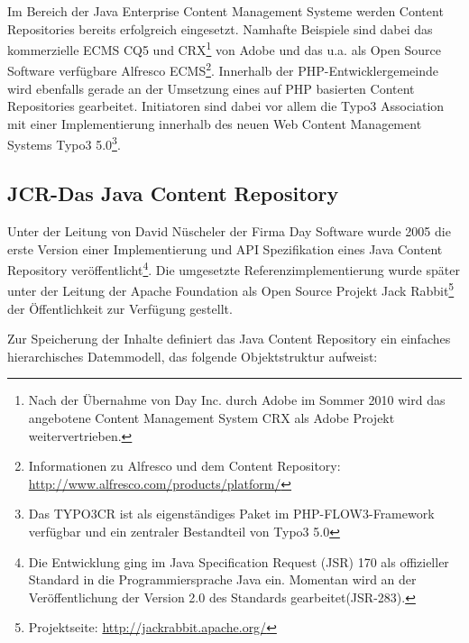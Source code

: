 Im Bereich der Java Enterprise Content Management Systeme werden Content Repositories bereits erfolgreich eingesetzt. Namhafte Beispiele sind dabei das kommerzielle ECMS CQ5 und CRX\footnote{Nach der Übernahme von Day Inc. durch Adobe im Sommer 2010 wird das angebotene Content Management System CRX als Adobe Projekt weitervertrieben.} von Adobe und das u.a. als Open Source Software verfügbare Alfresco ECMS\footnote{Informationen zu Alfresco und dem Content Repository: \href{http://www.alfresco.com/products/platform/}{http://www.alfresco.com/products/platform/}}.
Innerhalb der PHP-Entwicklergemeinde wird ebenfalls gerade an der Umsetzung eines auf PHP basierten Content Repositories gearbeitet. Initiatoren sind dabei vor allem die Typo3 Association mit einer Implementierung innerhalb des neuen Web Content Management Systems Typo3 5.0\footnote{Das TYPO3CR ist als eigenständiges Paket im PHP-FLOW3-Framework verfügbar und ein zentraler Bestandteil von Typo3 5.0}.


\subsection{JCR-Das Java Content Repository}

Unter der Leitung von David Nüscheler der Firma Day Software wurde 2005 die erste Version einer Implementierung und API Spezifikation eines Java Content Repository veröffentlicht\footnote{Die Entwicklung ging im Java Specification Request (JSR) 170 als offizieller Standard in die Programmiersprache Java ein. Momentan wird an der Veröffentlichung der Version 2.0 des Standards gearbeitet(JSR-283).}. Die umgesetzte Referenzimplementierung wurde später unter der Leitung der Apache Foundation als Open Source Projekt Jack Rabbit\footnote{Projektseite: \href{http://jackrabbit.apache.org/}{http://jackrabbit.apache.org/}} der Öffentlichkeit zur Verfügung gestellt.

Zur Speicherung der Inhalte definiert das Java Content Repository ein einfaches hierarchisches Datemmodell, das folgende Objektstruktur aufweist:



